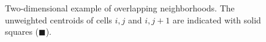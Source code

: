 \begin{figure}
	\hfill
	\caption{\sf Two-dimensional example of overlapping neighborhoods.  The unweighted centroids of cells $i,j$ and $i,j+1$ are indicated with solid squares ($\blacksquare$).} \label{fig:2nborTile}
\end{figure}

